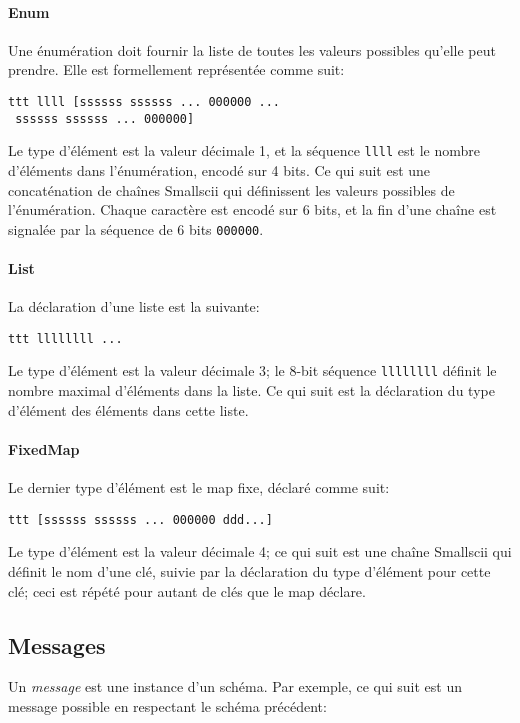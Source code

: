 \paragraph{Enum} Une énumération doit fournir la liste de toutes les valeurs possibles qu'elle peut prendre. Elle est formellement représentée comme suit:
%
\begin{verbatim}
ttt llll [ssssss ssssss ... 000000 ...
 ssssss ssssss ... 000000]
\end{verbatim}

Le type d'élément est la valeur décimale 1, et la séquence \verb+llll+ est le nombre d'éléments dans l'énumération, encodé sur 4 bits. Ce qui suit est une concaténation de chaînes Smallscii qui définissent les valeurs possibles de l'énumération. Chaque caractère est encodé sur 6 bits, et la fin d'une chaîne est signalée par la séquence de 6 bits \verb+000000+.

\paragraph{List} La déclaration d'une liste est la suivante:
%
\begin{verbatim}
ttt llllllll ...
\end{verbatim}

Le type d'élément est la valeur décimale 3; le 8-bit séquence \verb+llllllll+ définit le nombre maximal d'éléments dans la liste. Ce qui suit est la déclaration du type d'élément des éléments dans cette liste.

\paragraph{FixedMap} Le dernier type d'élément est le map fixe, déclaré comme suit:
%
\begin{verbatim}
ttt [ssssss ssssss ... 000000 ddd...]
\end{verbatim}

Le type d'élément est la valeur décimale 4; ce qui suit est une chaîne Smallscii qui définit le nom d'une clé, suivie par la déclaration du type d'élément pour cette clé; ceci est répété pour autant de clés que le map déclare.

\subsection{Messages}
\setcounter{paragraph}{0}

Un \emph{message} est une instance d'un schéma. Par exemple, ce qui suit est un message possible en respectant le schéma précédent:

